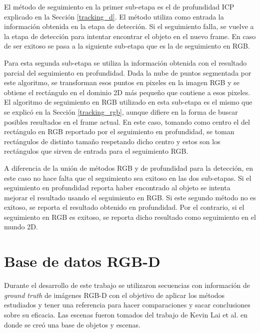 El método de seguimiento en la primer sub-etapa es el de profundidad ICP explicado en la Sección \ref{tracking_d}. El método utiliza como entrada la información obtenida en la etapa de detección. Si el seguimiento falla, se vuelve a la etapa de detección para intentar encontrar el objeto en el nuevo frame. En caso de ser exitoso se pasa a la siguiente sub-etapa que es la de seguimiento en RGB.

Para esta segunda sub-etapa se utiliza la información obtenida con el resultado parcial del seguimiento en profundidad. Dada la nube de puntos segmentada por este algoritmo, se transforman esos puntos en pixeles en la imagen RGB y se obtiene el rectángulo en el dominio 2D más pequeño que contiene a esos pixeles. El algoritmo de seguimiento en RGB utilizado en esta sub-etapa es el mismo que se explicó en la Sección \ref{tracking_rgb}, aunque difiere en la forma de buscar posibles resultados en el frame actual. En este caso, tomando como centro el del rectángulo en RGB reportado por el seguimiento en profundidad, se toman rectángulos de distinto tamaño respetando dicho centro y estos son los rectángulos que sirven de entrada para el seguimiento RGB. 

A diferencia de la unión de métodos RGB y de profundidad para la detección, en este caso no hace falta que el seguimiento sea exitoso en las dos sub-etapas. Si el seguimiento en profundidad reporta haber encontrado al objeto se intenta mejorar el resultado usando el seguimiento en RGB. Si este segundo método no es exitoso, se reporta el resultado obtenido en profundidad. Por el contrario, si el seguimiento en RGB es exitoso, se reporta dicho resultado como seguimiento en el mundo 2D.




\chapter{Base de datos RGB-D}\label{base_rgbd}
Durante el desarrollo de este trabajo se utilizaron secuencias con información de \textit{ground truth} de imágenes RGB-D con el objetivo de aplicar los métodos estudiados y tener una referencia para hacer comparaciones y sacar conclusiones sobre su eficacia. Las escenas fueron tomados del trabajo de Kevin Lai et al. \cite{lai2011large} en donde se creó una base de objetos y escenas.


